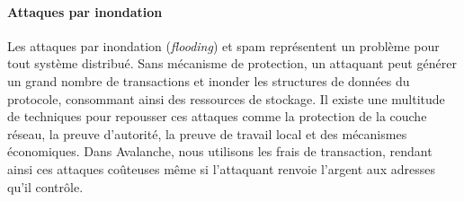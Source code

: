 \documentclass[letterpaper,twocolumn,10pt]{article}
\theoremstyle{definition}
\begin{document}

\paragraph{Attaques par inondation}
Les attaques par inondation (\emph{flooding}) et spam représentent un problème pour tout système distribué.
Sans mécanisme de protection, un attaquant peut générer un grand nombre de transactions et inonder les structures de données du protocole, consommant ainsi des ressources de stockage.
Il existe une multitude de techniques pour repousser ces attaques comme la protection de la couche réseau, la preuve d'autorité, la preuve de travail local et des mécanismes économiques.
Dans Avalanche, nous utilisons les frais de transaction, rendant ainsi ces attaques coûteuses même si l'attaquant renvoie l'argent aux adresses qu'il contrôle.



\end{document}
